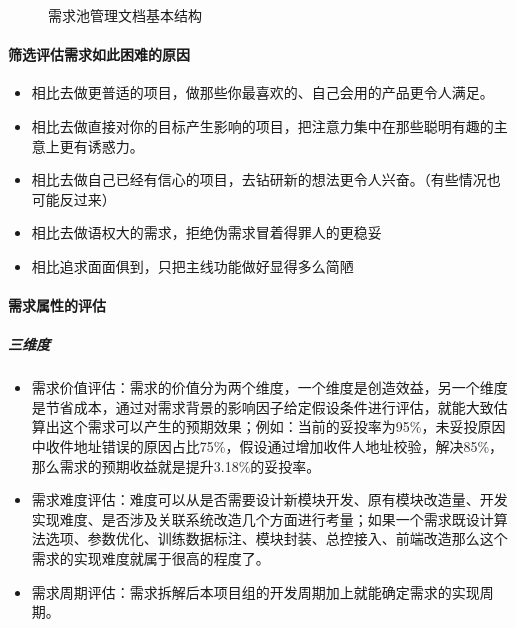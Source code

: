 \documentclass[letterpaper,10pt,english]{sphinxmanual}
\begin{document}
\begin{figure}[H]
\centering
\capstart

\noindent{}
\caption{需求池管理文档基本结构\sphinxfootnotemark[675]}\label{\detokenize{chapter_knowledge/upgrade_manage:id23}}\end{figure}
%
\begin{footnotetext}[675]\sphinxAtStartFootnote
{}
%
\end{footnotetext}\ignorespaces 

\paragraph{筛选评估需求如此困难的原因}
\label{\detokenize{chapter_knowledge/upgrade_manage:id15}}\begin{itemize}
\item {} 
相比去做更普适的项目，做那些你最喜欢的、自己会用的产品更令人满足。

\item {} 
相比去做直接对你的目标产生影响的项目，把注意力集中在那些聪明有趣的主意上更有诱惑力。

\item {} 
相比去做自己已经有信心的项目，去钻研新的想法更令人兴奋。（有些情况也可能反过来）

\item {} 
相比去做语权大的需求，拒绝伪需求冒着得罪人的更稳妥

\item {} 
相比追求面面俱到，只把主线功能做好显得多么简陋

\end{itemize}


\paragraph{需求属性的评估}
\label{\detokenize{chapter_knowledge/upgrade_manage:id16}}

\subparagraph{三维度}
\label{\detokenize{chapter_knowledge/upgrade_manage:id17}}\begin{itemize}
\item {} 
需求价值评估：需求的价值分为两个维度，一个维度是创造效益，另一个维度是节省成本，通过对需求背景的影响因子给定假设条件进行评估，就能大致估算出这个需求可以产生的预期效果；例如：当前的妥投率为95\%，未妥投原因中收件地址错误的原因占比75\%，假设通过增加收件人地址校验，解决85\%，那么需求的预期收益就是提升3.18\%的妥投率。

\item {} 
需求难度评估：难度可以从是否需要设计新模块开发、原有模块改造量、开发实现难度、是否涉及关联系统改造几个方面进行考量；如果一个需求既设计算法选项、参数优化、训练数据标注、模块封装、总控接入、前端改造那么这个需求的实现难度就属于很高的程度了。

\item {} 
需求周期评估：需求拆解后本项目组的开发周期加上就能确定需求的实现周期。

\end{itemize}
\end{document}
